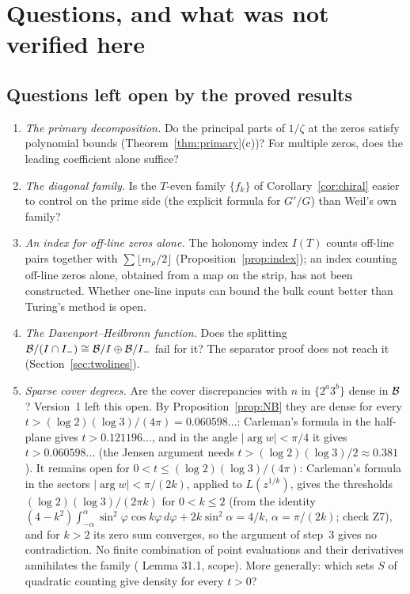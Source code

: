 \section{Questions, and what was not verified here}\label{sec:open}

\subsection{Questions left open by the proved results}

\begin{enumerate}[label=\arabic*.,ref=\arabic*]
\item\label{q:primary} \emph{The primary decomposition.} Do the principal parts of $1/\zeta$ at the zeros satisfy polynomial bounds (Theorem~\ref{thm:primary}(c))? For multiple zeros, does the leading coefficient alone suffice?
\item\label{q:diagonal} \emph{The diagonal family.} Is the $T$-even family $\{f_k\}$ of Corollary~\ref{cor:chiral} easier to control on the prime side (the explicit formula for $G'/G$) than Weil's own family?
\item \emph{An index for off-line zeros alone.} The holonomy index $I(T)$ counts off-line pairs together with $\sum\lfloor m_\rho/2\rfloor$ (Proposition~\ref{prop:index}); an index counting off-line zeros alone, obtained from a map on the strip, has not been constructed. Whether one-line inputs can bound the bulk count better than Turing's method is open.
\item \emph{The Davenport--Heilbronn function.} Does the splitting $\mathcal{B}/(I\cap I_-)\cong\mathcal{B}/I\oplus\mathcal{B}/I_-$ fail for it? The separator proof does not reach it (Section~\ref{sec:twolines}).
\item\label{q:sparse} \emph{Sparse cover degrees.} Are the cover discrepancies with $n$ in $\{2^a3^b\}$ dense in $\mathcal{B}$? Version~1 left this open. By Proposition~\ref{prop:NB} they are dense for every $t>(\log2)(\log3)/(4\pi)=0.060598\ldots$: Carleman's formula in the half-plane gives $t>0.121196\ldots$, and in the angle $|\arg w|<\pi/4$ it gives $t>0.060598\ldots$ (the Jensen argument needs $t>(\log2)(\log3)/2\approx0.381$). It remains open for $0<t\le(\log2)(\log3)/(4\pi)$: Carleman's formula in the sectors $|\arg w|<\pi/(2k)$, applied to $L(z^{1/k})$, gives the thresholds $(\log2)(\log3)/(2\pi k)$ for $0<k\le2$ (from the identity $(4-k^2)\int_{-\alpha}^{\alpha}\sin^2\varphi\cos k\varphi\,d\varphi+2k\sin^2\alpha=4/k$, $\alpha=\pi/(2k)$; check Z7), and for $k>2$ its zero sum converges, so the argument of step~3 gives no contradiction. No finite combination of point evaluations and their derivatives annihilates the family ( Lemma 31.1, scope). More generally: which sets $S$ of quadratic counting give density for every $t>0$?

\end{enumerate}
